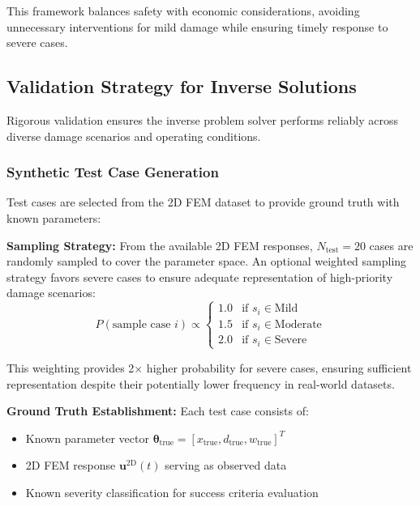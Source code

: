 \documentclass[12pt,a4paper]{report}
\begin{document}
This framework balances safety with economic considerations, avoiding unnecessary interventions for mild damage while ensuring timely response to severe cases.




\subsection{Validation Strategy for Inverse Solutions}

Rigorous validation ensures the inverse problem solver performs reliably across diverse damage scenarios and operating conditions.

\subsubsection{Synthetic Test Case Generation}
Test cases are selected from the 2D FEM dataset to provide ground truth with known parameters:

\textbf{Sampling Strategy:}
From the available 2D FEM responses, $N_{\text{test}} = 20$ cases are randomly sampled to cover the parameter space. An optional weighted sampling strategy favors severe cases to ensure adequate representation of high-priority damage scenarios:
\begin{equation}
P(\text{sample case } i) \propto \begin{cases}
1.0 & \text{if } s_i \in \text{Mild} \\
1.5 & \text{if } s_i \in \text{Moderate} \\
2.0 & \text{if } s_i \in \text{Severe}
\end{cases}
\label{eq:weighted_sampling}
\end{equation}

This weighting provides 2× higher probability for severe cases, ensuring sufficient representation despite their potentially lower frequency in real-world datasets.

\textbf{Ground Truth Establishment:}
Each test case consists of:
\begin{itemize}
    \item Known parameter vector $\boldsymbol{\theta}_{\text{true}} = [x_{\text{true}}, d_{\text{true}}, w_{\text{true}}]^T$
    \item 2D FEM response $\mathbf{u}^{\text{2D}}(t)$ serving as observed data
    \item Known severity classification for success criteria evaluation
\end{itemize}
\end{document}
